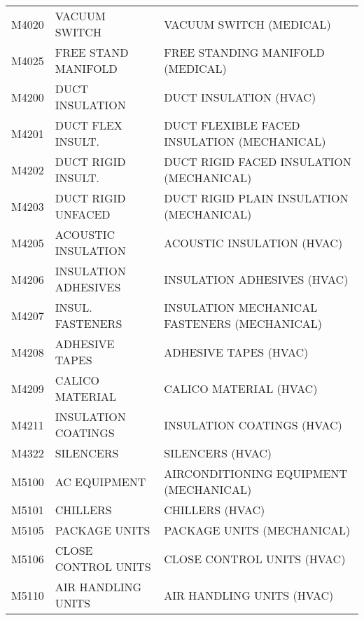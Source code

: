 \begin{longtable}[l]{l%
                  l|%
                  l|}
\rowcolor{thetableheadbgcolor!0.25!white} M4020       & VACUUM SWITCH   & VACUUM SWITCH (MEDICAL)   \\
\rowcolor{thetableheadbgcolor!0.25!white} M4025       & FREE STAND MANIFOLD   & FREE STANDING MANIFOLD (MEDICAL)   \\
\rowcolor{thetableheadbgcolor!0.25!white} M4200       & DUCT INSULATION   & DUCT INSULATION (HVAC)   \\
\rowcolor{thetableheadbgcolor!0.25!white} M4201       & DUCT FLEX INSULT.   & DUCT FLEXIBLE FACED INSULATION (MECHANICAL)   \\
\rowcolor{thetableheadbgcolor!0.25!white} M4202       & DUCT RIGID INSULT.   & DUCT RIGID FACED INSULATION (MECHANICAL)   \\
\rowcolor{thetableheadbgcolor!0.25!white} M4203       & DUCT RIGID UNFACED   & DUCT RIGID PLAIN INSULATION (MECHANICAL)   \\
\rowcolor{thetableheadbgcolor!0.25!white} M4205       & ACOUSTIC INSULATION   & ACOUSTIC INSULATION (HVAC)   \\
\rowcolor{thetableheadbgcolor!0.25!white} M4206       & INSULATION ADHESIVES   & INSULATION ADHESIVES (HVAC)   \\
\rowcolor{thetableheadbgcolor!0.25!white} M4207       & INSUL. FASTENERS   & INSULATION MECHANICAL FASTENERS (MECHANICAL)   \\
\rowcolor{thetableheadbgcolor!0.25!white} M4208       & ADHESIVE TAPES   & ADHESIVE TAPES (HVAC)   \\
\rowcolor{thetableheadbgcolor!0.25!white} M4209       & CALICO MATERIAL   & CALICO MATERIAL (HVAC)   \\
\rowcolor{thetableheadbgcolor!0.25!white} M4211       & INSULATION COATINGS   & INSULATION COATINGS (HVAC)   \\
\rowcolor{thetableheadbgcolor!0.25!white} M4322       & SILENCERS   & SILENCERS (HVAC)   \\
\rowcolor{thetableheadbgcolor!0.25!white} M5100       & AC EQUIPMENT   & AIRCONDITIONING EQUIPMENT (MECHANICAL)   \\
\rowcolor{thetableheadbgcolor!0.25!white} M5101       & CHILLERS   & CHILLERS (HVAC)   \\
\rowcolor{thetableheadbgcolor!0.25!white} M5105       & PACKAGE UNITS   & PACKAGE UNITS (MECHANICAL)   \\
\rowcolor{thetableheadbgcolor!0.25!white} M5106       & CLOSE CONTROL UNITS   & CLOSE CONTROL UNITS (HVAC)   \\
\rowcolor{thetableheadbgcolor!0.25!white} M5110       & AIR HANDLING UNITS   & AIR HANDLING UNITS (HVAC)   \\

\end{longtable}
